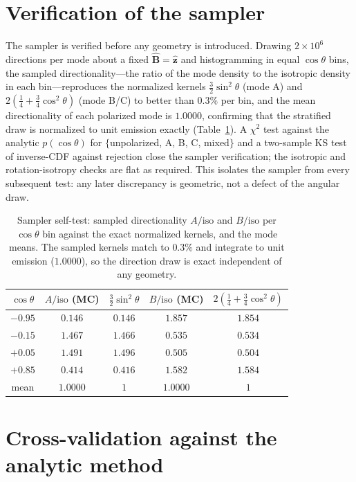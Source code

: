 \documentclass[11pt]{article}
\newcommand{\Bhat}{\hat{\bm{B}}}
\newcommand{\iso}{\mathrm{iso}}
\begin{document}
\section{Verification of the sampler}
\label{sec:sampler}

The sampler is verified before any geometry is introduced. Drawing $2\times10^6$
directions per mode about a fixed $\Bhat=\hat{\bm z}$ and histogramming in equal
$\cos\theta$ bins, the sampled directionality---the ratio of the mode density to the
isotropic density in each bin---reproduces the normalized kernels
$\tfrac32\sin^2\theta$ (mode A) and $2(\tfrac14+\tfrac34\cos^2\theta)$ (mode B/C) to
better than $0.3\%$ per bin, and the mean directionality of each polarized mode is
$1.0000$, confirming that the stratified draw is normalized to unit emission exactly
(Table~\ref{tab:sampler}). A $\chi^2$ test against the analytic $p(\cos\theta)$ for
$\{$unpolarized, A, B, C, mixed$\}$ and a two-sample KS test of inverse-CDF against
rejection close the sampler verification; the isotropic and rotation-isotropy checks are
flat as required. This isolates the sampler from every subsequent test: any later
discrepancy is geometric, not a defect of the angular draw.

\begin{table}[t]
\centering
\caption{Sampler self-test: sampled directionality $A/\iso$ and $B/\iso$ per
$\cos\theta$ bin against the exact normalized kernels, and the mode means. The sampled
kernels match to $0.3\%$ and integrate to unit emission ($1.0000$), so the direction draw
is exact independent of any geometry.}
\label{tab:sampler}
\begin{tabular}{ccccc}
\toprule
$\cos\theta$ & $A/\iso$ (MC) & $\tfrac32\sin^2\theta$ & $B/\iso$ (MC) & $2(\tfrac14+\tfrac34\cos^2\theta)$ \\
\midrule
$-0.95$ & $0.146$ & $0.146$ & $1.857$ & $1.854$ \\
$-0.15$ & $1.467$ & $1.466$ & $0.535$ & $0.534$ \\
$+0.05$ & $1.491$ & $1.496$ & $0.505$ & $0.504$ \\
$+0.85$ & $0.414$ & $0.416$ & $1.582$ & $1.584$ \\
\midrule
mean & $1.0000$ & $1$ & $1.0000$ & $1$ \\
\bottomrule
\end{tabular}
\end{table}

\section{Cross-validation against the analytic method}
\label{sec:validation}
\end{document}
